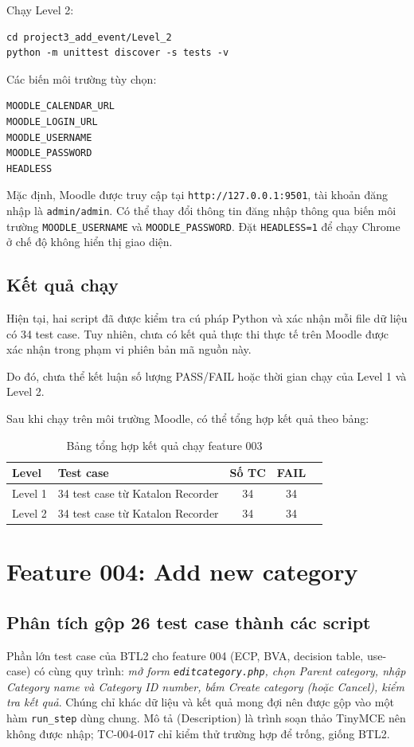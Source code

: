 \documentclass[12pt,a4paper]{article}
\begin{document}
Chạy Level 2:

\begin{lstlisting}
cd project3_add_event/Level_2
python -m unittest discover -s tests -v
\end{lstlisting}

Các biến môi trường tùy chọn:

\begin{lstlisting}
MOODLE_CALENDAR_URL
MOODLE_LOGIN_URL
MOODLE_USERNAME
MOODLE_PASSWORD
HEADLESS
\end{lstlisting}

Mặc định, Moodle được truy cập tại \texttt{http://127.0.0.1:9501}, tài khoản đăng nhập là \texttt{admin/admin}. Có thể thay đổi thông tin đăng nhập thông qua biến môi trường \texttt{MOODLE\_USERNAME} và \texttt{MOODLE\_PASSWORD}. Đặt \texttt{HEADLESS=1} để chạy Chrome ở chế độ không hiển thị giao diện.

\subsection{Kết quả chạy}

Hiện tại, hai script đã được kiểm tra cú pháp Python và xác nhận mỗi file dữ liệu có 34 test case. Tuy nhiên, chưa có kết quả thực thi thực tế trên Moodle được xác nhận trong phạm vi phiên bản mã nguồn này.

Do đó, chưa thể kết luận số lượng PASS/FAIL hoặc thời gian chạy của Level 1 và Level 2.

Sau khi chạy trên môi trường Moodle, có thể tổng hợp kết quả theo bảng:

\begin{table}[H]
\centering\small
\begin{tabular}{|L{2.5cm}|L{4.5cm}|c|c|c|}
\hline
{}
\textbf{Level} & \textbf{Test case} & \textbf{Số TC} & \textbf{FAIL} & \\ \hline
Level 1 & 34 test case từ Katalon Recorder & 34 & 34 \\ \hline
Level 2 & 34 test case từ Katalon Recorder & 34 & 34\\ \hline
\end{tabular}
\caption{Bảng tổng hợp kết quả chạy feature 003}
\end{table}


\section{Feature 004: Add new category}

\subsection{Phân tích gộp 26 test case thành các script}
Phần lớn test case của BTL2 cho feature 004 (ECP, BVA, decision table, use-case) có cùng quy trình:
\emph{mở form \texttt{editcategory.php}, chọn Parent category, nhập Category name và Category ID number, bấm Create category (hoặc Cancel), kiểm tra kết quả}.
Chúng chỉ khác dữ liệu và kết quả mong đợi nên được gộp vào một hàm \texttt{run\_step} dùng chung. Mô tả (Description) là trình soạn thảo TinyMCE nên không được nhập; TC-004-017 chỉ kiểm thử trường hợp để trống, giống BTL2.
\end{document}
